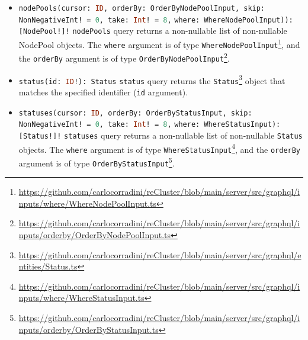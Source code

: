 \begin{itemize}
  \item \lstinline[language=graphql, morekeywords={[2]{NodePool, OrderByNodePoolInput, NonNegativeInt, WhereNodePoolInput}},
    morekeywords={[4]{cursor, orderBy, skip, take, where}}, morekeywords={[5]{nodePools}}]{nodePools(cursor: ID, orderBy: OrderByNodePoolInput, skip: NonNegativeInt! = 0, take: Int! = 8,}
    \newline
    \hphantom{----------------}\lstinline[language=graphql, morekeywords={[2]{NodePool, OrderByNodePoolInput, NonNegativeInt, WhereNodePoolInput}},
    morekeywords={[4]{cursor, orderBy, skip, take, where}}, morekeywords={[5]{nodePools}}]{where: WhereNodePoolInput)): [NodePool!]!}
    \newline
    \texttt{nodePools} query returns a non-nullable list of non-nullable NodePool
    objects.
    \newline
    The \texttt{where} argument is of type \texttt{WhereNodePoolInput}\footnote{\url{https://github.com/carlocorradini/reCluster/blob/main/server/src/graphql/inputs/where/WhereNodePoolInput.ts}},
    and the \texttt{orderBy} argument is of type \texttt{OrderByNodePoolInput}\footnote{\url{https://github.com/carlocorradini/reCluster/blob/main/server/src/graphql/inputs/orderby/OrderByNodePoolInput.ts}}.

  \item \lstinline[language=graphql, morekeywords={[2]{Status}}, morekeywords={[4]{id}},
    morekeywords={[5]{status}}]{status(id: ID!): Status}
    \newline
    \texttt{status} query returns the \texttt{Status}\footnote{\url{https://github.com/carlocorradini/reCluster/blob/main/server/src/graphql/entities/Status.ts}}
    object that matches the specified identifier (\texttt{id} argument).

  \item \lstinline[language=graphql, morekeywords={[2]{Status, OrderByStatusInput, NonNegativeInt, WhereStatusInput}},
    morekeywords={[4]{cursor, orderBy, skip, take, where}}, morekeywords={[5]{statuses}}]{statuses(cursor: ID, orderBy: OrderByStatusInput, skip: NonNegativeInt! = 0, take: Int! = 8,}
    \newline
    \hphantom{---------------}\lstinline[language=graphql, morekeywords={[2]{Status, OrderByStatusInput, NonNegativeInt, WhereStatusInput}},
    morekeywords={[4]{cursor, orderBy, skip, take, where}}, morekeywords={[5]{statuses}}]{where: WhereStatusInput): [Status!]!}
    \newline
    \texttt{statuses} query returns a non-nullable list of non-nullable \texttt{Status}
    objects.
    \newline
    The \texttt{where} argument is of type \texttt{WhereStatusInput}\footnote{\url{https://github.com/carlocorradini/reCluster/blob/main/server/src/graphql/inputs/where/WhereStatusInput.ts}},
    and the \texttt{orderBy} argument is of type \texttt{OrderByStatusInput}\footnote{\url{https://github.com/carlocorradini/reCluster/blob/main/server/src/graphql/inputs/orderby/OrderByStatusInput.ts}}.


\end{itemize}
